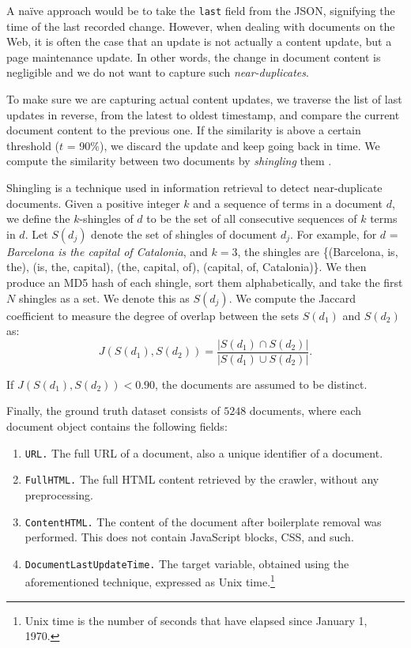 A naïve approach would be to take the \texttt{last} field from the JSON, signifying the time of the last recorded change. However, when dealing with documents on the Web, it is often the case that an update is not actually a content update, but a page maintenance update. In other words, the change in document content is negligible and we do not want to capture such \textit{near-duplicates}.

To make sure we are capturing actual content updates, we traverse the list of last updates in reverse, from the latest to oldest timestamp, and compare the current document content to the previous one. If the similarity is above a certain threshold ($t$ = 90\%), we discard the update and keep going back in time. We compute the similarity between two documents by \textit{shingling} them \citep{broder1997resemblance}.

Shingling is a technique used in information retrieval to detect near-duplicate documents. Given a positive integer $k$ and a sequence of terms in a document $d$, we define the $k$-shingles of $d$ to be the set of all consecutive sequences of $k$ terms in $d$. Let $S(d_j)$ denote the set of shingles of document $d_j$. For example, for $d$ = \textit{Barcelona is the capital of Catalonia}, and $k = 3$, the shingles are \{(Barcelona, is, the), (is, the, capital), (the, capital, of), (capital, of, Catalonia)\}. We then produce an MD5 hash of each shingle, sort them alphabetically, and take the first $N$ shingles as a set. We denote this as $S(d_j)$. We compute the Jaccard coefficient to measure the degree of overlap between the sets $S(d_1)$ and $S(d_2)$ as:
\[ J(S(d_1),S(d_2)) = \frac{\vert S(d_1) \cap S(d_2)\vert}{\vert S(d_1) \cup S(d_2)\vert}. \]

\noindent If $J(S(d_1),S(d_2)) < 0.90$, the documents are assumed to be distinct.

Finally, the ground truth dataset consists of $5248$ documents, where each document object contains the following fields:
\begin{enumerate}
	\item \texttt{URL.} The full URL of a document, also a unique identifier of a document.
	\item \texttt{FullHTML.} The full HTML content retrieved by the crawler, without any preprocessing.
    \item \texttt{ContentHTML.} The content of the document after boilerplate removal was performed. This does not contain JavaScript blocks, CSS, and such.
    \item \texttt{DocumentLastUpdateTime.} The target variable, obtained using the aforementioned technique, expressed as Unix time.\footnote{Unix time is the number of seconds that have elapsed since January 1, 1970.}
\end{enumerate}

